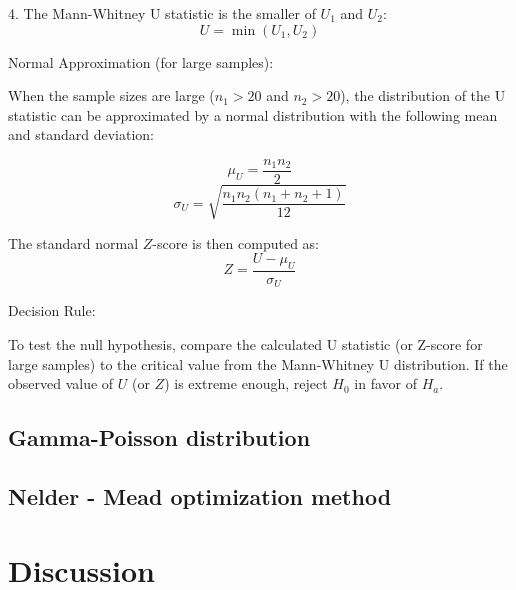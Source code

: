 \documentclass[conference]{IEEEtran}
\begin{document}
4. The Mann-Whitney U statistic is the smaller of \( U_1 \) and \( U_2 \):
\[
U = \min(U_1, U_2)
\]

Normal Approximation (for large samples):

When the sample sizes are large (\(n_1 > 20\) and \(n_2 > 20\)), the distribution of the U statistic can be approximated by a normal distribution with the following mean and standard deviation:

\[
\mu_U = \frac{n_1 n_2}{2}
\]
\[
\sigma_U = \sqrt{\frac{n_1 n_2 (n_1 + n_2 + 1)}{12}}
\]

The standard normal \( Z \)-score is then computed as:
\[
Z = \frac{U - \mu_U}{\sigma_U}
\]

Decision Rule:

To test the null hypothesis, compare the calculated U statistic (or Z-score for large samples) to the critical value from the Mann-Whitney U distribution. If the observed value of \( U \) (or \( Z \)) is extreme enough, reject \( H_0 \) in favor of \( H_a \).

\subsection{Gamma-Poisson distribution}


\subsection{Nelder - Mead optimization method}

\section{Discussion}

\newpage


\end{document}
